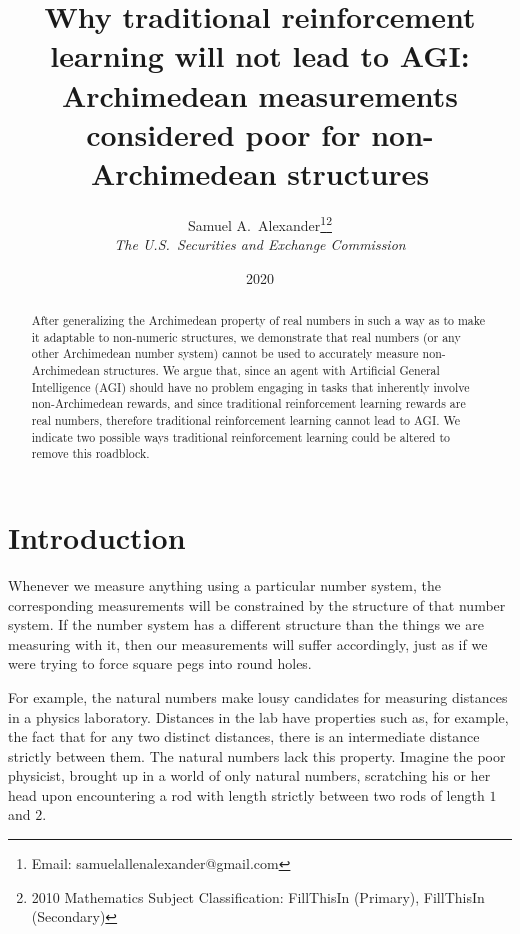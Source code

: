\documentclass[reqno]{article}
\theoremstyle{definition}
\begin{document}
\title{Why traditional reinforcement learning will not lead to AGI:
Archimedean measurements considered poor for non-Archimedean structures}

\author{Samuel A.~Alexander\thanks{Email:
samuelallenalexander@gmail.com}\hphantom{*}\footnote{2010 Mathematics 
Subject Classification: FillThisIn
(Primary), FillThisIn (Secondary)}\\
\emph{The U.S.\ Securities and Exchange Commission}}
\date{2020}
\maketitle

\begin{abstract}
    After generalizing the Archimedean property of real numbers in such a
    way as to make it adaptable to non-numeric structures, we demonstrate
    that real numbers (or any other Archimedean number system) cannot
    be used to accurately measure non-Archimedean structures. We argue that,
    since an agent with Artificial General Intelligence (AGI) should have
    no problem engaging in tasks that inherently involve non-Archimedean
    rewards, and since traditional reinforcement learning rewards are
    real numbers, therefore traditional reinforcement learning cannot lead
    to AGI. We indicate two possible ways traditional reinforcement learning
    could be altered to remove this roadblock.
\end{abstract}

\section{Introduction}

Whenever we measure anything using a particular number system, the
corresponding measurements will be constrained by the structure of that
number system. If the number system has a different structure than
the things we are measuring with it, then our
measurements will suffer accordingly, just as if we were trying to
force square pegs into round holes.

For example, the natural numbers make lousy candidates for measuring
distances in a physics laboratory. Distances in the lab have
properties such as, for example, the fact that for any two distinct
distances, there is an intermediate distance strictly between them.
The natural numbers lack this property. Imagine the poor physicist,
brought up in a world of only natural numbers, scratching his or her
head upon encountering a rod with length strictly between two rods
of length $1$ and $2$.
\end{document}
